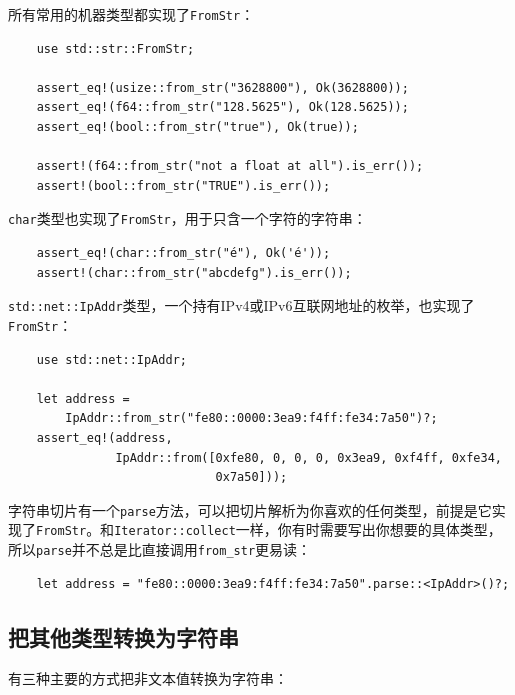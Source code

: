 所有常用的机器类型都实现了\texttt{FromStr}：
\begin{verbatim}
    use std::str::FromStr;

    assert_eq!(usize::from_str("3628800"), Ok(3628800));
    assert_eq!(f64::from_str("128.5625"), Ok(128.5625));
    assert_eq!(bool::from_str("true"), Ok(true));

    assert!(f64::from_str("not a float at all").is_err());
    assert!(bool::from_str("TRUE").is_err());
\end{verbatim}

\texttt{char}类型也实现了\texttt{FromStr}，用于只含一个字符的字符串：
\begin{verbatim}
    assert_eq!(char::from_str("é"), Ok('é'));
    assert!(char::from_str("abcdefg").is_err());
\end{verbatim}

\texttt{std::net::IpAddr}类型，一个持有IPv4或IPv6互联网地址的枚举，也实现了\texttt{FromStr}：
\begin{verbatim}
    use std::net::IpAddr;

    let address =
        IpAddr::from_str("fe80::0000:3ea9:f4ff:fe34:7a50")?;
    assert_eq!(address,
               IpAddr::from([0xfe80, 0, 0, 0, 0x3ea9, 0xf4ff, 0xfe34,
                             0x7a50]));
\end{verbatim}

字符串切片有一个\texttt{parse}方法，可以把切片解析为你喜欢的任何类型，前提是它实现了\texttt{FromStr}。和\texttt{Iterator::collect}一样，你有时需要写出你想要的具体类型，所以\texttt{parse}并不总是比直接调用\texttt{from\_str}更易读：
\begin{verbatim}
    let address = "fe80::0000:3ea9:f4ff:fe34:7a50".parse::<IpAddr>()?;
\end{verbatim}

\subsection{把其他类型转换为字符串}

有三种主要的方式把非文本值转换为字符串：

